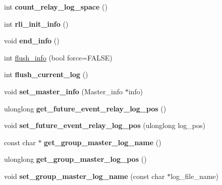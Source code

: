 \begin{DoxyCompactItemize}
int {\bfseries count\+\_\+relay\+\_\+log\+\_\+space} ()
\item 
\mbox{\label{classRelay__log__info_a652933ed5cc6ebef760e49c0af75f2f4}} 
int {\bfseries rli\+\_\+init\+\_\+info} ()
\item 
\mbox{\label{classRelay__log__info_a34a22720779f97a88bb702c795f63418}} 
void {\bfseries end\+\_\+info} ()
\item 
int \mbox{\hyperlink{classRelay__log__info_ab4299015e0504c30685b2e3b3e093d27}{flush\+\_\+info}} (bool force=F\+A\+L\+SE)
\item 
\mbox{\label{classRelay__log__info_a1887eadc1e77465893a27ec2ec31783e}} 
int {\bfseries flush\+\_\+current\+\_\+log} ()
\item 
\mbox{\label{classRelay__log__info_a587ebca8379f6efc957cfe7c142931f4}} 
void {\bfseries set\+\_\+master\+\_\+info} (Master\+\_\+info $\ast$info)
\item 
\mbox{\label{classRelay__log__info_a848ec09d6b0b7f92467ba77a06f12e22}} 
ulonglong {\bfseries get\+\_\+future\+\_\+event\+\_\+relay\+\_\+log\+\_\+pos} ()
\item 
\mbox{\label{classRelay__log__info_a810c03978cfab5184968a75cd2e98cf4}} 
void {\bfseries set\+\_\+future\+\_\+event\+\_\+relay\+\_\+log\+\_\+pos} (ulonglong log\+\_\+pos)
\item 
\mbox{\label{classRelay__log__info_a2bedd1496ce2b2f12bc9549612da39c1}} 
const char $\ast$ {\bfseries get\+\_\+group\+\_\+master\+\_\+log\+\_\+name} ()
\item 
\mbox{\label{classRelay__log__info_a29ea309de4fad4a3a8a7d32fbba04799}} 
ulonglong {\bfseries get\+\_\+group\+\_\+master\+\_\+log\+\_\+pos} ()
\item 
\mbox{\label{classRelay__log__info_a7f6eca9519fb6cf63ea08764f8f5ecb3}} 
void {\bfseries set\+\_\+group\+\_\+master\+\_\+log\+\_\+name} (const char $\ast$log\+\_\+file\+\_\+name)
\item 
\mbox{\label{classRelay__log__info_a9efea5a95de42b86eccef1f403466f94}} 

\end{DoxyCompactItemize}
